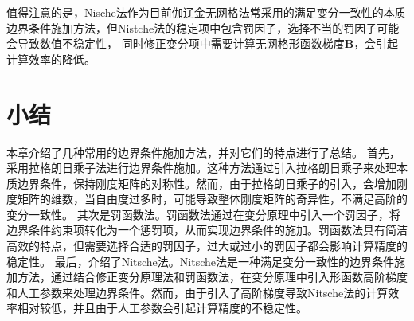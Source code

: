 值得注意的是，Nische法作为目前伽辽金无网格法常采用的满足变分一致性的本质边界条件施加方法，但Nistche法的稳定项中包含罚因子，选择不当的罚因子可能会导致数值不稳定性，
同时修正变分项中需要计算无网格形函数梯度$\pmb{B}$，会引起计算效率的降低。
\section{小结}
本章介绍了几种常用的边界条件施加方法，并对它们的特点进行了总结。
首先，采用拉格朗日乘子法进行边界条件施加。这种方法通过引入拉格朗日乘子来处理本质边界条件，保持刚度矩阵的对称性。然而，由于拉格朗日乘子的引入，会增加刚度矩阵的维数，当自由度过多时，可能导致整体刚度矩阵的奇异性，不满足高阶的变分一致性。
其次是罚函数法。罚函数法通过在变分原理中引入一个罚因子，将边界条件约束项转化为一个惩罚项，从而实现边界条件的施加。罚函数法具有简洁高效的特点，但需要选择合适的罚因子，过大或过小的罚因子都会影响计算精度的稳定性。
最后，介绍了Nitsche法。Nitsche法是一种满足变分一致性的边界条件施加方法，通过结合修正变分原理法和罚函数法，在变分原理中引入形函数高阶梯度和人工参数来处理边界条件。然而，由于引入了高阶梯度导致Nitsche法的计算效率相对较低，并且由于人工参数会引起计算精度的不稳定性。




